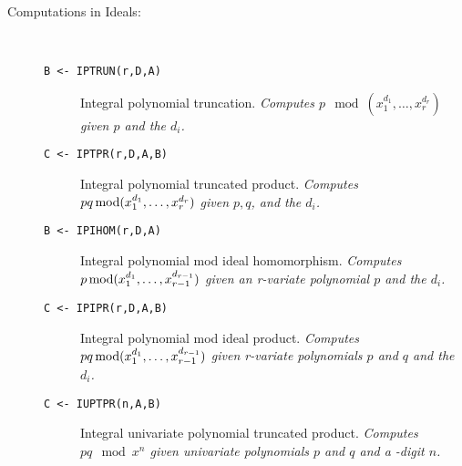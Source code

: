 \begin{description}
\begin{description}
  \end{description}

\item[Computations in Ideals:] \ \
  \begin{description}
  \item[{\tt B <- IPTRUN(r,D,A) 
}]  Integral polynomial truncation. {\em Computes $p \mod
    (x_1^{d_1},\ldots,x_r^{d_r})$ given $p$ and the $d_i$.}
  \item[{\tt C <- IPTPR(r,D,A,B) 
}]  Integral polynomial truncated product. {\em Computes $p
    q \mod \\(x_1^{d_1},\ldots,x_r^{d_r})$ given $p, q$, and the
    $d_i$.}
  \item[{\tt B <- IPIHOM(r,D,A) 
}]  Integral polynomial mod ideal homomorphism. {\em Computes
    $p \mod \\(x_1^{d_1},\ldots,x_{r-1}^{d_{r-1}})$ given an
    r-variate polynomial $p$ and the $d_i$.}
  \item[{\tt C <- IPIPR(r,D,A,B) 
}]  Integral polynomial mod ideal product. {\em Computes $p
    q \mod \\(x_1^{d_1},\ldots,x_{r-1}^{d_{r-1}})$ given r-variate
    polynomials $p$ and $q$ and the $d_i$.}
  \item[{\tt C <- IUPTPR(n,A,B) 
}]  Integral univariate polynomial truncated product. {\em
    Computes $p q \mod x^n$ given univariate polynomials $p$ and $q$ and a
    \BETA-digit $n$.}

  \end{description}


\end{description}

